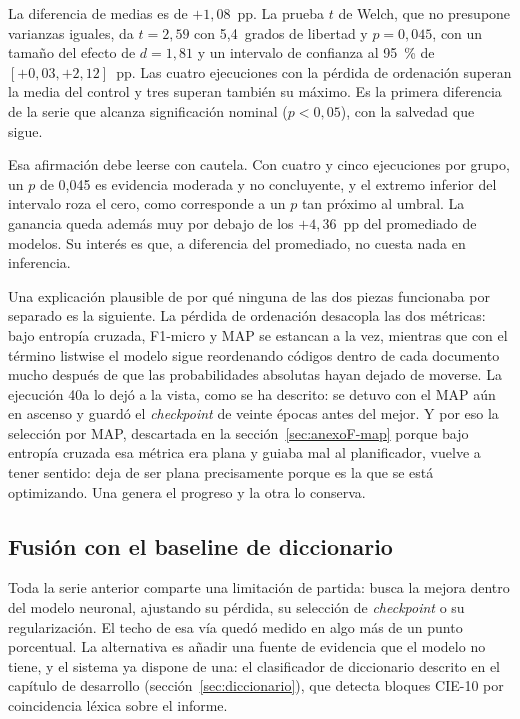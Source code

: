 La diferencia de medias es de $+1{,}08$~pp. La prueba $t$ de Welch, que no presupone varianzas iguales, da $t = 2{,}59$ con 5{,}4~grados de libertad y $p = 0{,}045$, con un tamaño del efecto de $d = 1{,}81$ y un intervalo de confianza al 95~\% de $[+0{,}03, +2{,}12]$~pp. Las cuatro ejecuciones con la pérdida de ordenación superan la media del control y tres superan también su máximo. Es la primera diferencia de la serie que alcanza significación nominal (\(p<0{,}05\)), con la salvedad que sigue.

Esa afirmación debe leerse con cautela. Con cuatro y cinco ejecuciones por grupo, un $p$ de 0{,}045 es evidencia moderada y no concluyente, y el extremo inferior del intervalo roza el cero, como corresponde a un $p$ tan próximo al umbral. La ganancia queda además muy por debajo de los $+4{,}36$~pp del promediado de modelos. Su interés es que, a diferencia del promediado, no cuesta nada en inferencia.

Una explicación plausible de por qué ninguna de las dos piezas funcionaba por separado es la siguiente. La pérdida de ordenación desacopla las dos métricas: bajo entropía cruzada, F1-micro y MAP se estancan a la vez, mientras que con el término listwise el modelo sigue reordenando códigos dentro de cada documento mucho después de que las probabilidades absolutas hayan dejado de moverse. La ejecución 40a lo dejó a la vista, como se ha descrito: se detuvo con el MAP aún en ascenso y guardó el \emph{checkpoint} de veinte épocas antes del mejor. Y por eso la selección por MAP, descartada en la sección~\ref{sec:anexoF-map} porque bajo entropía cruzada esa métrica era plana y guiaba mal al planificador, vuelve a tener sentido: deja de ser plana precisamente porque es la que se está optimizando. Una genera el progreso y la otra lo conserva.

\subsection{Fusión con el baseline de diccionario}
\label{sec:anexoF-fusion}

Toda la serie anterior comparte una limitación de partida: busca la mejora dentro del modelo neuronal, ajustando su pérdida, su selección de \emph{checkpoint} o su regularización. El techo de esa vía quedó medido en algo más de un punto porcentual. La alternativa es añadir una fuente de evidencia que el modelo no tiene, y el sistema ya dispone de una: el clasificador de diccionario descrito en el capítulo de desarrollo (sección~\ref{sec:diccionario}), que detecta bloques CIE-10 por coincidencia léxica sobre el informe.

